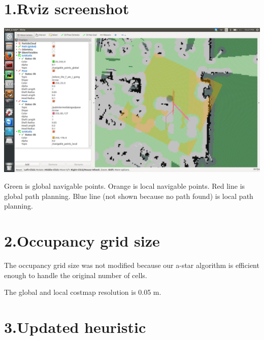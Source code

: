 \documentclass{article}
\begin{document}
\mdxtitleblockstart{}
\mdxauthorstart{}
\mdxauthorend\mdtitleauthorrunning{}{}\mdxtitleblockend%

\section{1.\hspace*{0.5em}Rviz screenshot}\label{sec-rviz-screenshot}%

\noindent{}\includegraphics[keepaspectratio=true,width=\dimmin{}{\dimwidth{0.90}}]{images/Screenshot-from-2016-04-17-22-47-49}{}%

\noindent{}Green is global navigable points. Orange is local navigable points. Red line is global path planning. Blue line (not shown because no path found) is local path planning.%

\section{2.\hspace*{0.5em}Occupancy grid size}\label{sec-occupancy-grid-size}%

\noindent{}The occupancy grid size was not modified because our a-star algorithm is efficient enough to handle the original number of cells.%

The global and local costmap resolution is 0.05 m.%

\section{3.\hspace*{0.5em}Updated heuristic}\label{sec-updated-heuristic}%
\end{document}
